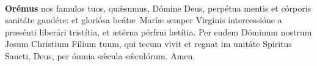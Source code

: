\orapronobissalve\\[2mm]
\textbf{Orémus}
 nos famulos tuos, qu{\'\ae}sumus, Dómine Deus, perpétua mentis et córporis sanitáte gaudére: et gloriósa beát{\ae}\ Marí{\ae} semper Virginis intercessióne
a pr{\ae}sénti liberári tristítia, et {\ae}térna pérfrui l{\ae}títia. Per eudem Dóminum nostrum Jesum Christium Filium tuum, qui tecum vivit et regnat im unitáte Spiritus Sancti,
Deus, per ómnia s{\'\ae}cula s{\'\ae}culórum. Amen.